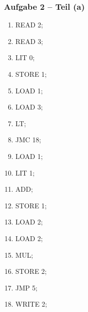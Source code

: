 \documentclass[aspectratio=1610,onlymath, ngerman]{beamer}
\begin{document}
    \begin{frame} \frametitle{Aufgabe 2 -- Teil (a)}
    \small
    \centering
	    \begin{minipage}{\dimexpr0.3\linewidth-\fboxrule-\fboxsep}
	    	\centering
	    	\begin{ttfamily}
	    		\begin{enumerate}[label=\arabic*:, nolistsep, leftmargin=*]
	    			\item READ 2; 
	    			\item READ 3;
	    			\item LIT 0;
	    			\item STORE 1;
	    			\item LOAD 1;
	    			\item LOAD 3;
	    			\item LT;
	    			\item JMC 18;
	    			\item LOAD 1;
	    		\end{enumerate}
	    	\end{ttfamily}
	   \end{minipage}
	   \begin{minipage}{\dimexpr0.3\linewidth-\fboxrule-\fboxsep}
	   	\centering
	    	\begin{ttfamily}
	    		\begin{enumerate}[label=\arabic*:, nolistsep, leftmargin=*]
	    			\setcounter{enumi}{9}
	    			\item LIT 1;
	    			\item ADD; 
	    			\item STORE 1;
	    			\item LOAD 2;
	    			\item LOAD 2; 
	    			\item MUL;
	    			\item STORE 2;
	    			\item JMP 5;
	    			\item WRITE 2;
	    		\end{enumerate}
	    	\end{ttfamily}
	    \end{minipage}
    \end{frame}
\end{document}
